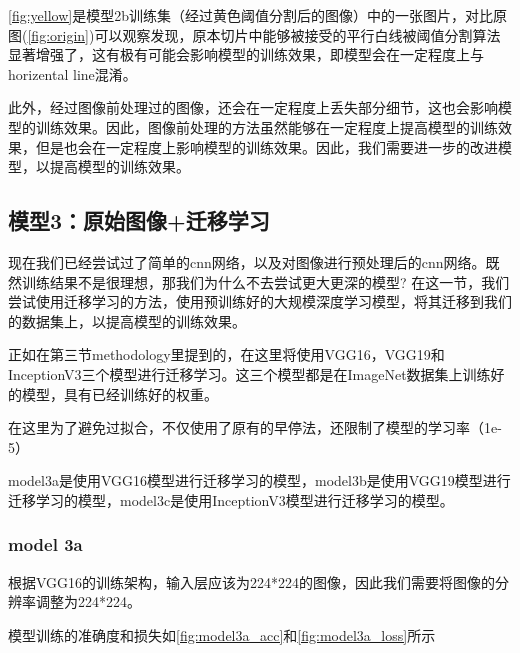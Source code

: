 \autoref{fig:yellow}是模型2b训练集（经过黄色阈值分割后的图像）中的一张图片，对比原图(\autoref{fig:origin})可以观察发现，原本切片中能够被接受的平行白线被阈值分割算法显著增强了，这有极有可能会影响模型的训练效果，即模型会在一定程度上与horizental line混淆。

此外，经过图像前处理过的图像，还会在一定程度上丢失部分细节，这也会影响模型的训练效果。因此，图像前处理的方法虽然能够在一定程度上提高模型的训练效果，但是也会在一定程度上影响模型的训练效果。因此，我们需要进一步的改进模型，以提高模型的训练效果。

\FloatBarrier
\subsection{模型3：原始图像+迁移学习}

现在我们已经尝试过了简单的cnn网络，以及对图像进行预处理后的cnn网络。既然训练结果不是很理想，那我们为什么不去尝试更大更深的模型? 在这一节，我们尝试使用迁移学习的方法，使用预训练好的大规模深度学习模型，将其迁移到我们的数据集上，以提高模型的训练效果。

正如在第三节methodology里提到的，在这里将使用VGG16，VGG19和InceptionV3三个模型进行迁移学习。这三个模型都是在ImageNet数据集上训练好的模型，具有已经训练好的权重。

在这里为了避免过拟合，不仅使用了原有的早停法，还限制了模型的学习率（1e-5）

model3a是使用VGG16模型进行迁移学习的模型，model3b是使用VGG19模型进行迁移学习的模型，model3c是使用InceptionV3模型进行迁移学习的模型。

\subsubsection{model 3a}
根据VGG16的训练架构，输入层应该为224*224的图像，因此我们需要将图像的分辨率调整为224*224。

模型训练的准确度和损失如\autoref{fig:model3a_acc}和\autoref{fig:model3a_loss}所示


